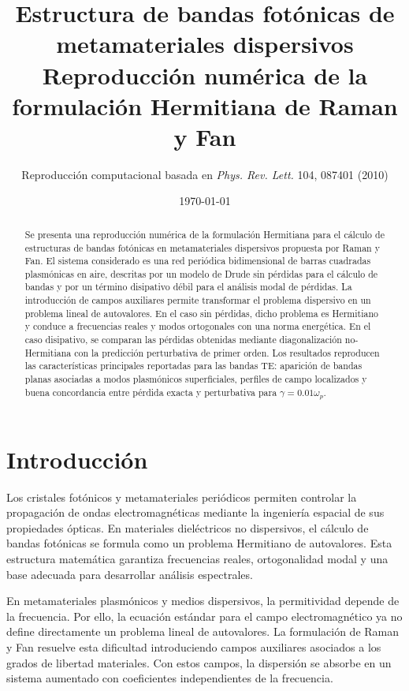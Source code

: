 \documentclass[11pt,a4paper]{article}
\title{
  \textbf{Estructura de bandas fotónicas de metamateriales dispersivos}\\[0.35em]
  \large Reproducción numérica de la formulación Hermitiana de Raman y Fan
}
\author{
  Reproducción computacional basada en \textit{Phys. Rev. Lett.} 104, 087401 (2010)
}
\date{\today}
\newcommand{\omegap}{\omega_p}
\begin{document}
\maketitle

\begin{abstract}
Se presenta una reproducción numérica de la formulación Hermitiana para el
cálculo de estructuras de bandas fotónicas en metamateriales dispersivos
propuesta por Raman y Fan. El sistema considerado es una red periódica
bidimensional de barras cuadradas plasmónicas en aire, descritas por un modelo
de Drude sin pérdidas para el cálculo de bandas y por un término disipativo
débil para el análisis modal de pérdidas. La introducción de campos auxiliares
permite transformar el problema dispersivo en un problema lineal de autovalores.
En el caso sin pérdidas, dicho problema es Hermitiano y conduce a frecuencias
reales y modos ortogonales con una norma energética. En el caso disipativo, se
comparan las pérdidas obtenidas mediante diagonalización no-Hermitiana con la
predicción perturbativa de primer orden. Los resultados reproducen las
características principales reportadas para las bandas TE: aparición de bandas
planas asociadas a modos plasmónicos superficiales, perfiles de campo
localizados y buena concordancia entre pérdida exacta y perturbativa para
$\gamma = 0.01\omegap$.
\end{abstract}

\tableofcontents
\newpage

\section{Introducción}

Los cristales fotónicos y metamateriales periódicos permiten controlar la
propagación de ondas electromagnéticas mediante la ingeniería espacial de sus
propiedades ópticas. En materiales dieléctricos no dispersivos, el cálculo de
bandas fotónicas se formula como un problema Hermitiano de autovalores. Esta
estructura matemática garantiza frecuencias reales, ortogonalidad modal y una
base adecuada para desarrollar análisis espectrales.

En metamateriales plasmónicos y medios dispersivos, la permitividad depende de
la frecuencia. Por ello, la ecuación estándar para el campo electromagnético ya
no define directamente un problema lineal de autovalores. La formulación de
Raman y Fan resuelve esta dificultad introduciendo campos auxiliares asociados
a los grados de libertad materiales. Con estos campos, la dispersión se absorbe
en un sistema aumentado con coeficientes independientes de la frecuencia.
\end{document}
